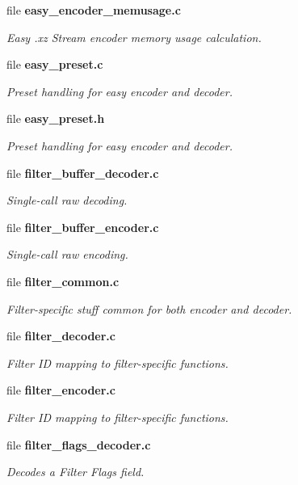 \begin{DoxyCompactItemize}
file \textbf{ easy\+\_\+encoder\+\_\+memusage.\+c}
\begin{DoxyCompactList}\small\item\em Easy .xz Stream encoder memory usage calculation. \end{DoxyCompactList}\item 
file \textbf{ easy\+\_\+preset.\+c}
\begin{DoxyCompactList}\small\item\em Preset handling for easy encoder and decoder. \end{DoxyCompactList}\item 
file \textbf{ easy\+\_\+preset.\+h}
\begin{DoxyCompactList}\small\item\em Preset handling for easy encoder and decoder. \end{DoxyCompactList}\item 
file \textbf{ filter\+\_\+buffer\+\_\+decoder.\+c}
\begin{DoxyCompactList}\small\item\em Single-\/call raw decoding. \end{DoxyCompactList}\item 
file \textbf{ filter\+\_\+buffer\+\_\+encoder.\+c}
\begin{DoxyCompactList}\small\item\em Single-\/call raw encoding. \end{DoxyCompactList}\item 
file \textbf{ filter\+\_\+common.\+c}
\begin{DoxyCompactList}\small\item\em Filter-\/specific stuff common for both encoder and decoder. \end{DoxyCompactList}\item 
file \textbf{ filter\+\_\+decoder.\+c}
\begin{DoxyCompactList}\small\item\em Filter ID mapping to filter-\/specific functions. \end{DoxyCompactList}\item 
file \textbf{ filter\+\_\+encoder.\+c}
\begin{DoxyCompactList}\small\item\em Filter ID mapping to filter-\/specific functions. \end{DoxyCompactList}\item 
file \textbf{ filter\+\_\+flags\+\_\+decoder.\+c}
\begin{DoxyCompactList}\small\item\em Decodes a Filter Flags field. \end{DoxyCompactList}\item 

\end{DoxyCompactItemize}
